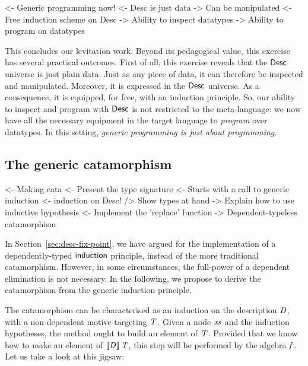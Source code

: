 \begin{wstructure}
<- Generic programming now!
    <- Desc is just data
        -> Can be manipulated
    <- Free induction scheme on Desc
        -> Ability to inspect datatypes
        -> Ability to program on datatypes
\end{wstructure}



This concludes our levitation work. Beyond its pedagogical value, this
exercise has several practical outcomes. First of all, this exercise
reveals that the $\Desc$ universe is just plain data. Just as any
piece of data, it can therefore be inspected and
manipulated. Moreover, it is expressed in the $\Desc$ universe. As a
consequence, it is equipped, for free, with an induction
principle. So, our ability to inspect and program with $\Desc$ is not
restricted to the meta-language: we now have all the necessary
equipment in the target language to \emph{program} over datatypes. In
this setting, \emph{generic programming is just about programming}.


\subsection{The generic catamorphism}

\begin{wstructure}
<- Making cata
    <- Present the type signature
    <- Starts with a call to generic induction
        <- induction on Desc!
        /> Show types at hand
        -> Explain how to use inductive hypothesis
    <- Implement the 'replace' function
    -> Dependent-typeless catamorphism 
\end{wstructure}

In Section~\ref{sec:desc-fix-point}, we have argued for the
implementation of a dependently-typed $\F{induction}$ principle,
instead of the more traditional catamorphism. However, in some
circumstances, the full-power of a dependent elimination is not
necessary. In the following, we propose to derive the catamorphism
from the generic induction principle. 

The catamorphism can be characterised as an induction on the
description $\V{D}$, with a non-dependent motive targeting $\V{T}$. Given a
node $\V{xs}$ and the induction hypotheses, the method ought to build an
element of $\V{T}$. Provided that we know how to make an element of
$\descop{\V{D}}{\V{T}}$, this step will be performed by the algebra $\V{f}$. Let
us take a look at this jigsaw:

